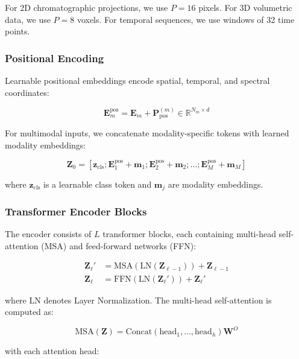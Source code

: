 \documentclass[12pt,a4paper]{article}
\begin{document}
For 2D chromatographic projections, we use $P=16$ pixels. For 3D volumetric data, we use $P=8$ voxels. For temporal sequences, we use windows of 32 time points.

\subsubsection{Positional Encoding}

Learnable positional embeddings encode spatial, temporal, and spectral coordinates:

\begin{equation}
\mathbf{E}_m^{\text{pos}} = \mathbf{E}_m + \mathbf{P}_{\text{pos}}^{(m)} \in \mathbb{R}^{N_m \times d}
\end{equation}

For multimodal inputs, we concatenate modality-specific tokens with learned modality embeddings:

\begin{equation}
\mathbf{Z}_0 = [\mathbf{z}_{\text{cls}}; \mathbf{E}_1^{\text{pos}} + \mathbf{m}_1; \mathbf{E}_2^{\text{pos}} + \mathbf{m}_2; \ldots; \mathbf{E}_M^{\text{pos}} + \mathbf{m}_M]
\end{equation}

where $\mathbf{z}_{\text{cls}}$ is a learnable class token and $\mathbf{m}_j$ are modality embeddings.

\subsubsection{Transformer Encoder Blocks}

The encoder consists of $L$ transformer blocks, each containing multi-head self-attention (MSA) and feed-forward networks (FFN):

\begin{align}
\mathbf{Z}_\ell' &= \text{MSA}(\text{LN}(\mathbf{Z}_{\ell-1})) + \mathbf{Z}_{\ell-1} \\
\mathbf{Z}_\ell &= \text{FFN}(\text{LN}(\mathbf{Z}_\ell')) + \mathbf{Z}_\ell'
\end{align}

where LN denotes Layer Normalization. The multi-head self-attention is computed as:

\begin{equation}
\text{MSA}(\mathbf{Z}) = \text{Concat}(\text{head}_1, \ldots, \text{head}_h) \mathbf{W}^O
\end{equation}

with each attention head:
\end{document}
